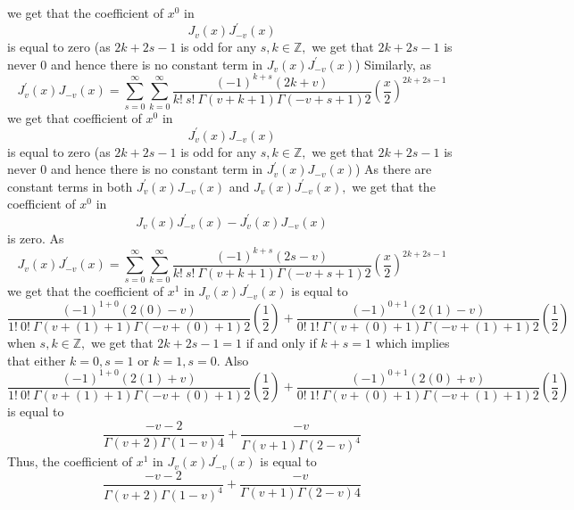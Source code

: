 \documentclass{article}
\begin{document}
\begin{flushleft}
we get that the coefficient of $x^{0}$ in 
$$J_{v}(x) J_{-v}^{\prime}(x)$$ is equal to zero (as $2 k+2 s-1$ is odd for any $s, k \in \mathbb{Z},$ we get that $2 k+2 s-1$ is never 0 and hence there is no constant term in $J_{v}(x) J_{-v}^{\prime}(x)$) Similarly, as 
$$J_{v}^{\prime}(x) J_{-v}(x)=\sum_{s=0}^{\infty} \sum_{k=0}^{\infty} \frac{(-1)^{k+s}(2 k+v)}{k ! \  s ! \  \Gamma(v+k+1) \Gamma(-v+s+1) 2}\left(\frac{x}{2}\right)^{2 k+2 s-1}$$ 
we get that coefficient of $x^{0}$ in 
$$J_{v}^{\prime}(x) J_{-v}(x)$$ 
is equal to zero (as $2 k+2 s-1$ is odd for any $s, k \in \mathbb{Z},$ we get that $2 k+2 s-1$ is never 0 and hence there is no constant term in $J_{v}^{\prime}(x) J_{-v}(x)$) As there are constant terms in both $J_{v}^{\prime}(x) J_{-v}(x)$ and $J_{v}(x) J_{-v}^{\prime}(x),$ we get that the coefficient of $x^{0}$ in 
$$J_{v}(x) J_{-v}^{\prime}(x)-J_{v}^{\prime}(x) J_{-v}(x)$$ 
is zero. As 
$$J_{v}(x) J_{-v}^{\prime}(x)=\sum_{s=0}^{\infty} \sum_{k=0}^{\infty} \frac{(-1)^{k+s}(2 s-v)}{k ! \  s ! \  \Gamma(v+k+1) \Gamma(-v+s+1) 2}\left(\frac{x}{2}\right)^{2 k+2 s-1}$$
we get that the coefficient
of $x^{1}$ in $J_{v}(x) J_{-v}^{\prime}(x)$ is equal to 
$$\frac{(-1)^{1+0}(2(0)-v)}{1 ! \  0 ! \  \Gamma(v+(1)+1) \Gamma(-v+(0)+1) 2}\left(\frac{1}{2}\right)+\frac{(-1)^{0+1}(2(1)-v)}{0 ! \  1 ! \  \Gamma(v+(0)+1) \Gamma(-v+(1)+1) 2}\left(\frac{1}{2}\right)$$ 
when $s, k \in \mathbb{Z},$ we get that $2 k+2 s-1=1$ if and only if $k+s=1$ which implies that either $k=0, s=1$ or $k=1, s=0$. Also 
$$\frac{(-1)^{1+0}(2(1)+v)}{1 ! \  0 ! \  \Gamma(v+(1)+1) \Gamma(-v+(0)+1) 2}\left(\frac{1}{2}\right)+\frac{(-1)^{0+1}(2(0)+v)}{0 ! \  1 ! \  \Gamma(v+(0)+1) \Gamma(-v+(1)+1) 2}\left(\frac{1}{2}\right)$$
is equal to 
$$\frac{-v-2}{\Gamma(v+2) \Gamma(1-v) 4}+\frac{-v}{\Gamma(v+1) \Gamma(2-v)^{4}}$$
Thus, the coefficient of $x^{1}$ in $J_{v}(x) J_{-v}^{\prime}(x)$ is equal to 
$$\frac{-v-2}{\Gamma(v+2) \Gamma(1-v)^{4}}+\frac{-v}{\Gamma(v+1) \Gamma(2-v) 4}$$


\end{flushleft}
\end{document}
